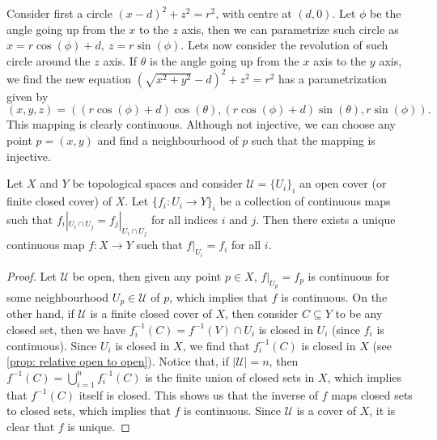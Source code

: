 \begin{example}
    Consider first a circle \((x - d)^2 + z^2 = r^2\), with centre at \((d, 0)\).
    Let \(\phi\) be the angle going up from the \(x\) to the \(z\) axis, then we
    can parametrize such circle as \(x = r \cos(\phi) + d,\ z = r\sin(\phi)\).
    Lets now consider the revolution of such circle around the \(z\) axis. If
    \(\theta\) is the angle going up from the \(x\) axis to the \(y\) axis, we
    find the new equation \((\sqrt{x^2 + y^2} - d)^2 + z^2 = r^2\) has a
    parametrization given by
    \[
        (x, y, z) = ((r \cos(\phi) + d)\cos(\theta), (r\cos(\phi) + d)\sin(\theta),
        r\sin(\phi)).
    \]
    This mapping is clearly continuous. Although not injective, we can choose any
    point \(p = (x, y)\) and find a neighbourhood of \(p\) such that the mapping
    is injective.
\end{example}

\begin{lemma}[Gluing]
    Let \(X\) and \(Y\) be topological spaces and consider
    \(\mathcal U = \{U_i\}_i\) an open cover (or finite closed cover) of \(X\). Let
    \(\{f_i: U_i \to Y\}_i\) be a collection of continuous maps such that
    \(f_i|_{U_i \cap U_j} = f_j|_{U_i \cap U_j}\) for all indices \(i\) and
    \(j\). Then there exists a unique continuous map \(f: X \to Y\) such that
    \(f|_{U_i} = f_i\) for all \(i\).
\end{lemma}

\begin{proof}
    Let \(\mathcal U\) be open, then given any point \(p \in X\), \(f|_{U_p} = f_p\)
    is continuous for some neighbourhood \(U_p \in \mathcal U\) of \(p\), which
    implies that \(f\) is continuous. On the other hand, if \(\mathcal U\) is a
    finite closed cover of \(X\), then consider \(C \subseteq Y\) to be any closed
    set, then we have \(f_i^{-1}(C) = f^{-1}(V) \cap U_i\) is closed in \(U_i\)
    (since \(f_i\) is continuous). Since \(U_i\) is closed in \(X\), we find that
    \(f_i^{-1}(C)\) is closed in \(X\) (see \cref{prop: relative open to open}).
    Notice that, if \(|\mathcal U| = n\), then
    \(f^{-1}(C) = \bigcup_{i=1}^n f_i^{-1}(C)\) is the finite union of closed sets
    in \(X\), which implies that \(f^{-1}(C)\) itself is closed. This shows us that
    the inverse of \(f\) maps closed sets to closed sets, which implies that \(f\)
    is continuous.  Since \(\mathcal U\) is a cover of \(X\), it is clear that \(f\)
    is unique.
\end{proof}

